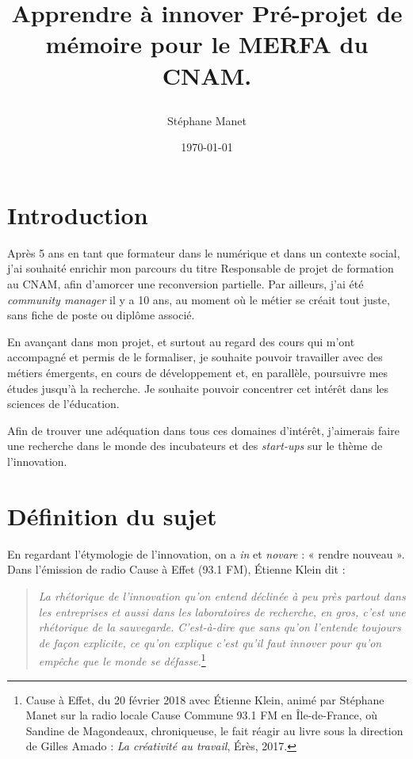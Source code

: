 \documentclass{article}
\author{Stéphane Manet}
\date{\today}
\title{%
    \begin{minipage}\linewidth
        \centering\bfseries
        Apprendre à innover
        \vskip3pt
        \large Pré-projet de mémoire pour le MERFA du CNAM.
    \end{minipage}
}
\begin{document}
\maketitle %
\tableofcontents


\section*{Introduction}

Après 5 ans en tant que formateur dans le numérique et dans un contexte social, j'ai souhaité enrichir mon parcours du titre Responsable de projet de formation au CNAM, afin d'amorcer une reconversion partielle. 
Par ailleurs, j'ai été \emph{community manager} il y a 10 ans, au moment où le métier se créait tout juste, sans fiche de poste ou diplôme associé. 

En avançant dans mon projet, et surtout au regard des cours qui m'ont accompagné et permis de le formaliser, je souhaite pouvoir travailler avec des métiers émergents, en cours de développement et, en parallèle, poursuivre mes études jusqu'à la recherche. Je souhaite pouvoir concentrer cet intérêt dans les sciences de l'éducation.

Afin de trouver une adéquation dans tous ces domaines d'intérêt, j'aimerais faire une recherche dans le monde des incubateurs et des \emph{start-ups} sur le thème de l'innovation.

\section{Définition du sujet}

En regardant l'étymologie de l'innovation, on a \emph{in} et \emph{novare} : « rendre nouveau ». Dans l'émission de radio Cause à Effet (93.1 FM), Étienne Klein dit :

\begin{quote}
\textit{La rhétorique de l'innovation qu'on entend déclinée à peu près partout dans les entreprises et aussi dans les laboratoires de recherche, en gros, c'est une rhétorique de la sauvegarde. C'est-à-dire que sans qu'on l'entende toujours de façon explicite, ce qu'on explique c'est qu'il faut innover pour qu'on empêche que le monde se défasse.}\footnote{Cause à Effet, du 20 février 2018 avec Étienne Klein, animé par Stéphane Manet sur la radio locale Cause Commune 93.1 FM en Île-de-France, où Sandine de Magondeaux, chroniqueuse, le fait réagir au livre sous la direction de Gilles Amado : \emph{La créativité au travail}, Érès, 2017.}
\end{quote} 
\end{document}
